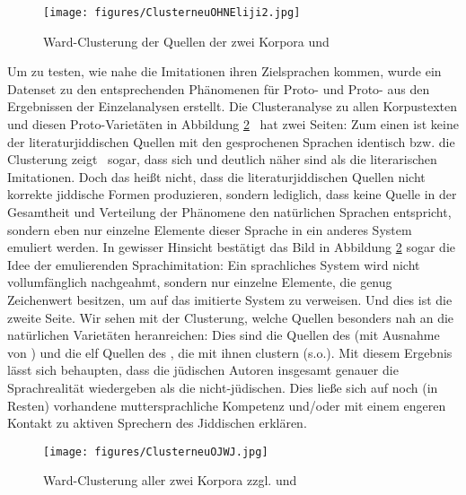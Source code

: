 \begin{figure}
\centering
\texttt{[image: figures/ClusterneuOHNEliji2.jpg]}
		\caption{\label{dreikorporaplotcluster} Ward-Clusterung der Quellen der zwei Korpora  und }
	\end{figure}


	
\noindent Um zu testen, wie nahe die Imitationen ihren Zielsprachen kommen, wurde ein Datenset zu den entsprechenden Phänomenen für Proto- und Proto- aus den Ergebnissen der Einzelanalysen erstellt. Die Clusteranalyse zu allen Korpustexten und diesen Proto-Varietäten in Abbildung \ref{WJOJcluster} \,%
 hat zwei Seiten: Zum einen ist keine der literaturjiddischen Quellen mit den gesprochenen Sprachen identisch bzw. die Clusterung zeigt \,%
 sogar, dass sich \hai{{\WJ}} und \hai{{\OJ}} deutlich näher sind als die literarischen Imitationen. Doch das heißt nicht, dass  die literaturjiddischen Quellen nicht korrekte jiddische Formen produzieren, sondern lediglich, dass keine Quelle in der Gesamtheit und Verteilung der Phänomene den natürlichen Sprachen entspricht, sondern eben nur einzelne Elemente dieser Sprache in ein anderes System emuliert werden. In gewisser Hinsicht bestätigt das Bild in Abbildung \ref{WJOJcluster} sogar die Idee der emulierenden Sprachimitation: Ein sprachliches System wird nicht vollumfänglich nachgeahmt, sondern nur einzelne Elemente, die genug Zeichenwert  besitzen, um auf das imitierte System zu verweisen. Und dies ist die zweite Seite. Wir sehen mit der Clusterung, welche Quellen besonders nah an die natürlichen Varietäten heranreichen: Dies sind die Quellen des  (mit Ausnahme von ) und die elf Quellen des , die mit ihnen clustern (s.o.). Mit diesem Ergebnis \,%
 lässt sich behaupten, dass die jüdischen Autoren insgesamt genauer die Sprachrealität wiedergeben als die nicht-jüdischen. Dies ließe sich auf noch (in Resten) vorhandene muttersprachliche Kompetenz und/oder mit einem engeren Kontakt zu aktiven Sprechern des Jiddischen erklären. 	
 

	\begin{figure}
\texttt{[image: figures/ClusterneuOJWJ.jpg]}
		\caption{\label{WJOJcluster} Ward-Clusterung aller zwei Korpora zzgl. \hai{{\WJ}} und \hai{{\OJ}} }
	\end{figure}


